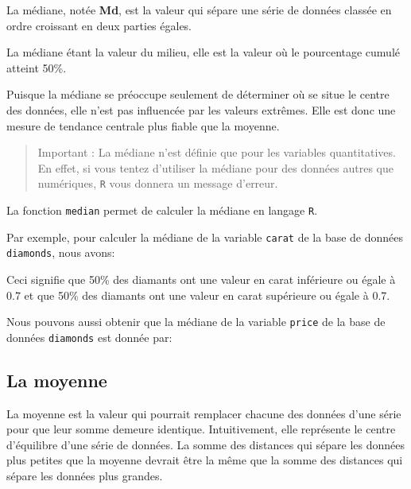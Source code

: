 \documentclass[]{book}
\newenvironment{Shaded}{\begin{snugshade}}{\end{snugshade}}
\newcommand{\KeywordTok}[1]{\textcolor[rgb]{0.13,0.29,0.53}{\textbf{#1}}}
\newcommand{\NormalTok}[1]{#1}
\newcommand{\OperatorTok}[1]{\textcolor[rgb]{0.81,0.36,0.00}{\textbf{#1}}}
\theoremstyle{definition}
\theoremstyle{definition}
\theoremstyle{definition}
\theoremstyle{remark}
\begin{document}
La médiane, notée \textbf{Md}, est la valeur qui sépare une série de
données classée en ordre croissant en deux parties égales.

La médiane étant la valeur du milieu, elle est la valeur où le
pourcentage cumulé atteint 50\%.

Puisque la médiane se préoccupe seulement de déterminer où se situe le
centre des données, elle n'est pas influencée par les valeurs extrêmes.
Elle est donc une mesure de tendance centrale plus fiable que la
moyenne.

\begin{quote}
Important : La médiane n'est définie que pour les variables
quantitatives. En effet, si vous tentez d'utiliser la médiane pour des
données autres que numériques, \texttt{R} vous donnera un message
d'erreur.
\end{quote}

La fonction \texttt{median} permet de calculer la médiane en langage
\texttt{R}.

Par exemple, pour calculer la médiane de la variable \texttt{carat} de
la base de données \texttt{diamonds}, nous avons:

\begin{Shaded}
\end{Shaded}

Ceci signifie que 50\% des diamants ont une valeur en carat inférieure
ou égale à 0.7 et que 50\% des diamants ont une valeur en carat
supérieure ou égale à 0.7.

Nous pouvons aussi obtenir que la médiane de la variable \texttt{price}
de la base de données \texttt{diamonds} est donnée par:

\begin{Shaded}
\end{Shaded}

\hypertarget{la-moyenne}{%
\subsection{La moyenne}\label{la-moyenne}}

La moyenne est la valeur qui pourrait remplacer chacune des données
d'une série pour que leur somme demeure identique. Intuitivement, elle
représente le centre d'équilibre d'une série de données. La somme des
distances qui sépare les données plus petites que la moyenne devrait
être la même que la somme des distances qui sépare les données plus
grandes.
\end{document}
